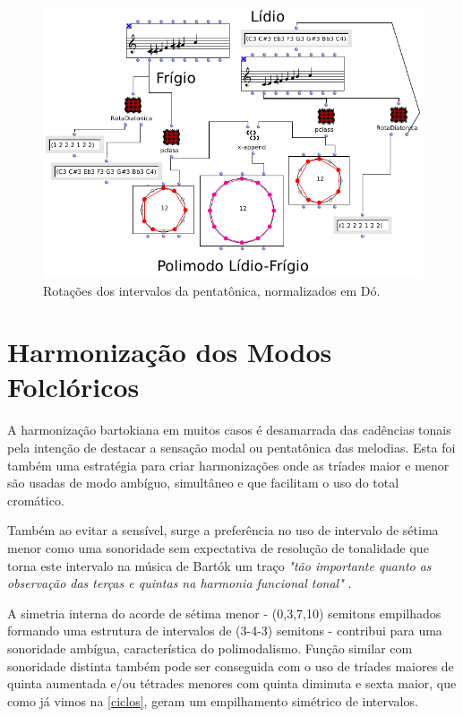 \documentclass[
	12pt,				%
	openright,			%
	twoside,			%
	a4paper,			%
	english,			%
	french,				%
	spanish,			%
	brazil				%
	]{abntex2}
\begin{document}
\begin{figure}[!h]
	\caption{\label{fig_grafico}Rotações dos intervalos da pentatônica, normalizados em Dó. }
	\begin{center}
	    \includegraphics[scale=0.5]{modal/lidiofrigioOM.png}
	\end{center}
\end{figure}


\section{Harmonização dos Modos Folclóricos}


A harmonização  bartokiana em muitos casos é desamarrada das cadências tonais pela intenção de destacar a sensação modal ou pentatônica das melodias. Esta foi também uma estratégia para criar harmonizações onde as tríades maior e menor são usadas de modo ambíguo, simultâneo e que facilitam o uso do total cromático. 

Também ao evitar a sensível, surge a preferência no uso de intervalo de sétima menor como uma sonoridade sem expectativa de resolução de tonalidade que torna este intervalo na música de Bartók um traço \textit{"tão importante quanto as observação das terças e quintas na harmonia funcional tonal"} \cite[p. 28]{antokoletz1984music}. 

A simetria interna do acorde de sétima menor - (0,3,7,10) semitons empilhados formando uma estrutura de intervalos de (3-4-3) semitons - contribui para uma sonoridade ambígua, característica do polimodalismo. Função similar com sonoridade distinta também pode ser conseguida com o uso de tríades maiores de quinta aumentada e/ou tétrades menores com quinta diminuta e sexta maior, que como já vimos na \autoref{ciclos}, geram um empilhamento simétrico de intervalos.
\end{document}
